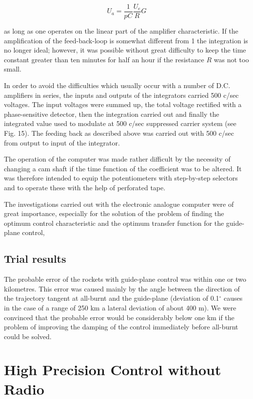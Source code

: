 \documentclass[12pt, a4paper]{article}
\begin{document}
\begin{equation}
  U_{a}=\frac{1}{pC}\frac{U_{e}}{R}G
\end{equation}

as long as one operates on the linear part of the amplifier characteristic. If the amplification of the feed-back-loop is somewhat different from 1 the integration is no longer ideal; however, it was possible without great difficulty to keep the time constant greater than ten minutes for half an hour if the resistance $R$ was not too small.

In order to avoid the difficulties which usually occur with a number of D.C. amplifiers in series, the inputs and outputs of the integrators carried 500 c/sec voltages. The input voltages were summed up, the total voltage rectified with a phase-sensitive detector, then the integration carried out and finally the integrated value used to modulate at 500 c/sec suppressed carrier system (see Fig. 15). The feeding back as described above was carried out with 500 c/sec from output to input of the integrator.

The operation of the computer was made rather difficult by the necessity of changing a cam shaft if the time function of the coefficient was to be altered. It was therefore intended to equip the potentiometers with step-by-step selectors and to operate these with the help of perforated tape.

The investigations carried out with the electronic analogue computer were of great importance, especially for the solution of the problem of finding the optimum control characteristic and the optimum transfer function for the guide-plane control,

\subsection{Trial results}

The probable error of the rockets with guide-plane control was within one or two kilometres. This error was caused mainly by the angle between the direction of the trajectory tangent at all-burnt and the guide-plane (deviation of 0.1$^{\circ}$ causes in the case of a range of 250 km a lateral deviation of about 400 m). We were convinced that the probable error would be considerably below one km if the problem of improving the damping of the control immediately before all-burnt could be solved.

\section{High Precision Control without Radio}
\end{document}
